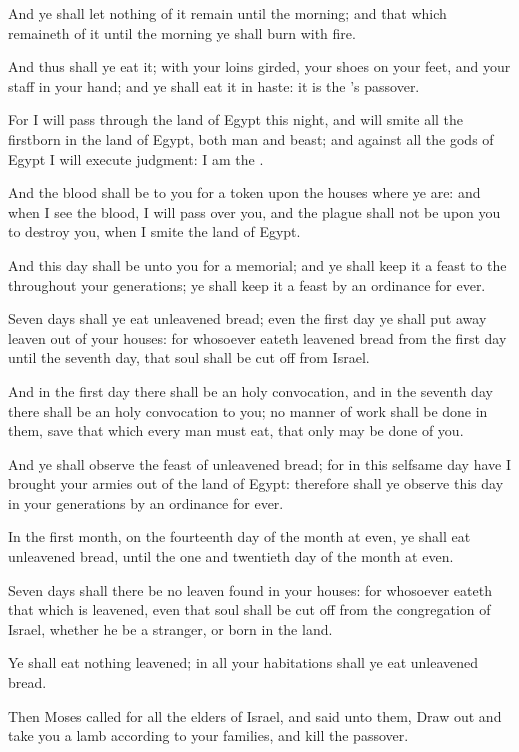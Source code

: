 \Verse And ye shall let nothing of it remain until the morning; and that which remaineth of it until the morning ye shall burn with fire.

\Verse And thus shall ye eat it; with your loins girded, your shoes on your feet, and your staff in your hand; and ye shall eat it in haste: it is the \LORD's passover.

\Verse For I will pass through the land of Egypt this night, and will smite all the firstborn in the land of Egypt, both man and beast; and against all the gods of Egypt I will execute judgment: I am the \LORD.

\Verse And the blood shall be to you for a token upon the houses where ye are: and when I see the blood, I will pass over you, and the plague shall not be upon you to destroy you, when I smite the land of Egypt.

\Verse And this day shall be unto you for a memorial; and ye shall keep it a feast to the \LORD throughout your generations; ye shall keep it a feast by an ordinance for ever.

\Verse Seven days shall ye eat unleavened bread; even the first day ye shall put away leaven out of your houses: for whosoever eateth leavened bread from the first day until the seventh day, that soul shall be cut off from Israel.

\Verse And in the first day there shall be an holy convocation, and in the seventh day there shall be an holy convocation to you; no manner of work shall be done in them, save that which every man must eat, that only may be done of you.

\Verse And ye shall observe the feast of unleavened bread; for in this selfsame day have I brought your armies out of the land of Egypt: therefore shall ye observe this day in your generations by an ordinance for ever.

\Verse In the first month, on the fourteenth day of the month at even, ye shall eat unleavened bread, until the one and twentieth day of the month at even.

\Verse Seven days shall there be no leaven found in your houses: for whosoever eateth that which is leavened, even that soul shall be cut off from the congregation of Israel, whether he be a stranger, or born in the land.

\Verse Ye shall eat nothing leavened; in all your habitations shall ye eat unleavened bread.

\Verse Then Moses called for all the elders of Israel, and said unto them, Draw out and take you a lamb according to your families, and kill the passover.

